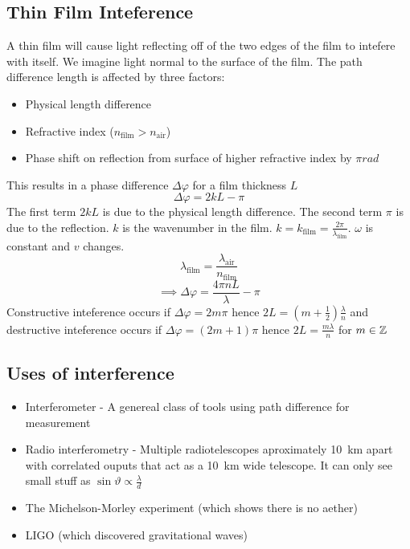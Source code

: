 \subsection*{Thin Film Inteference}

A thin film will cause light reflecting off of the two edges of the film to intefere with itself. We imagine light normal to the surface of the film. The path difference length is affected by three factors:
\begin{itemize}
\item Physical length difference
\item Refractive index (\(n_{\text{film}}>n_{\text{air}}\))
\item Phase shift on reflection from surface of higher refractive index by \(\si{\pi rad}\) 
\end{itemize}
This results in a phase difference \(\Delta\varphi\) for a film thickness \(L\)
\[\Delta\varphi=2kL-\pi\]
The first term \(2kL\) is due to the physical length difference. The second term \(\pi\) is due to the reflection. \(k\) is the wavenumber in the film. \(k = k_{\text{film}}=\frac{2\pi}{\lambda_{\text{film}}}\). \(\omega\) is constant and \(v\) changes.
\[\lambda_{\text{film}}=\frac{\lambda_{\text{air}}}{n_{\text{film}}}\]
\[\implies\Delta\varphi=\frac{4\pi nL}{\lambda}-\pi\]
Constructive inteference occurs if \(\Delta\varphi=2m\pi\) hence \(2L = \left(m+\frac 12\right)\frac{\lambda}{n}\) and destructive inteference occurs if \(\Delta\varphi=(2m+1)\pi\) hence \(2L = \frac{m\lambda}{n}\) for \(m\in\mathbb{Z}\)

\subsection*{Uses of interference}

\begin{itemize}
\item Interferometer - A genereal class of tools using path difference for measurement
\item Radio interferometry - Multiple radiotelescopes aproximately \SI{10}{km} apart with correlated ouputs that act as a \SI{10}{km} wide telescope. It can only see small stuff as \(\sin\vartheta\propto\frac{\lambda}{d}\)
\item The Michelson-Morley experiment (which shows there is no aether)
\item LIGO (which discovered gravitational waves)
\end{itemize}
